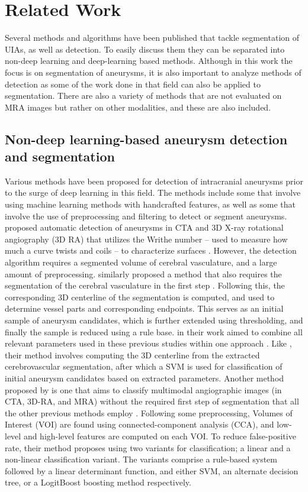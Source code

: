 \chapter{Related Work}
\label{chapter2}

Several methods and algorithms have been published that tackle segmentation of UIAs, as well as detection. To easily discuss them they can be separated into non-deep learning and deep-learning based methods. Although in this work the focus is on segmentation of aneurysms, it is also important to analyze methods of detection as some of the work done in that field can also be applied to segmentation. There are also a variety of methods that are not evaluated on MRA images but rather on other modalities, and these are also included.

\section{Non-deep learning-based aneurysm detection and segmentation}
Various methods have been proposed for detection of intracranial aneurysms prior to the surge of deep learning in this field. The methods include some that involve using machine learning methods with handcrafted features, as well as some that involve the use of preprocessing and filtering to detect or segment aneurysms. \citeauthor{Lauric2010} proposed automatic detection of aneurysms in CTA and 3D X-ray rotational angiography (3D RA) that utilizes the Writhe number -- used to measure how much a curve twists and coils -- to characterize surfaces \cite{Lauric2010}. However, the detection algorithm requires a segmented volume of cerebral vasculature, and a large amount of preprocessing. \citeauthor{Yang2011} similarly proposed a method that also requires the segmentation of the cerebral vasculature in the first step \cite{Yang2011}. Following this, the corresponding 3D centerline of the segmentation is computed, and used to determine vessel parts and corresponding endpoints. This serves as an initial sample of aneurysm candidates, which is further extended using thresholding, and finally the sample is reduced using a rule base. \citeauthor{Suniaga2012} in their work aimed to combine all relevant parameters used in these previous studies within one approach \cite{Suniaga2012}. Like \citeauthor{Yang2011}, their method involves computing the 3D centerline from the extracted cerebrovascular segmentation, after which a SVM is used for classification of initial aneurysm candidates based on extracted parameters. Another method proposed by \citeauthor{Hentschke2014} is one that aims to classify multimodal angiographic images (in CTA, 3D-RA, and MRA) without the required first step of segmentation that all the other previous methods employ \cite{Hentschke2014}. Following some preprocessing, Volumes of Interest (VOI) are found using connected-component analysis (CCA), and low-level and high-level features are computed on each VOI. To reduce false-positive rate, their method proposes using two variants for classification; a linear and a non-linear classification variant. The variants comprise a rule-based system followed by a linear determinant function, and either SVM, an alternate decision tree, or a LogitBoost boosting method respectively. 

